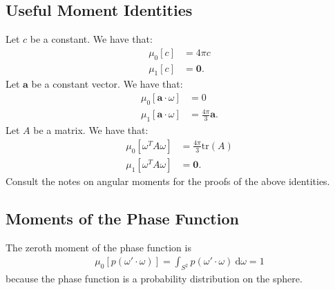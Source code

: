 \documentclass[10pt]{article}
\newcommand{\dee}{\mathrm{d}}
\newcommand{\ve}[1]{\mathbf{#1}}
\newcommand{\tr}{\mathrm{tr}}
\begin{document}
  \subsection{Useful Moment Identities}
  Let $c$ be a constant.  We have that:
  \begin{align}
  	\mu_0[c] &= 4\pi c \\
  	\mu_1[c] &= \ve{0}.
  \end{align}
  Let $\ve{a}$ be a constant vector.  We have that:
  \begin{align}
  	\mu_0[\ve{a} \cdot \omega] &= 0 \\
  	\mu_1[\ve{a} \cdot \omega] &= \frac{4\pi}{3}\ve{a}.
  \end{align}
  Let $A$ be a matrix.  We have that:
  \begin{align}
  	\mu_0[\omega^T A \omega] &= \frac{4\pi}{3} \tr(A) \\
  	\mu_1[\omega^T A \omega] &= \ve{0}.
  \end{align}
  Consult the notes on angular moments for the proofs of the above identities.

  \subsection{Moments of the Phase Function}
  The zeroth moment of the phase function is
  \begin{align}
  	\mu_0[p(\omega' \cdot \omega)] = \int_{S^2} p(\omega' \cdot \omega)\ \dee\omega = 1
  \end{align}
  because the phase function is a probability distribution on the sphere.
\end{document}
